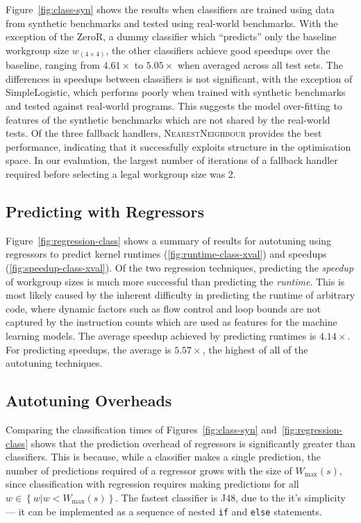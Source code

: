\documentclass[preprint,nonatbib,10pt,nocopyrightspace]{sigplanconf}
\begin{document}
Figure~\ref{fig:class-syn} shows the results when classifiers are
trained using data from synthetic benchmarks and tested using
real-world benchmarks. With the exception of the ZeroR, a dummy
classifier which ``predicts'' only the baseline workgroup size
$w_{\left( 4 \times 4 \right)}$, the other classifiers achieve good
speedups over the baseline, ranging from $4.61\times$ to $5.05\times$
when averaged across all test sets. The differences in speedups
between classifiers is not significant, with the exception of
SimpleLogistic, which performs poorly when trained with synthetic
benchmarks and tested against real-world programs. This suggests the
model over-fitting to features of the synthetic benchmarks which are
not shared by the real-world tests. Of the three fallback handlers,
\textsc{NearestNeighbour} provides the best performance, indicating
that it successfully exploits structure in the optimisation space. In
our evaluation, the largest number of iterations of a fallback handler
required before selecting a legal workgroup size was 2.


\subsection{Predicting with Regressors}

Figure~\ref{fig:regression-class} shows a summary of results for
autotuning using regressors to predict kernel runtimes
(\ref{fig:runtime-class-xval}) and speedups
(\ref{fig:speedup-class-xval}). Of the two regression techniques,
predicting the \emph{speedup} of workgroup sizes is much more
successful than predicting the \emph{runtime}. This is most likely
caused by the inherent difficulty in predicting the runtime of
arbitrary code, where dynamic factors such as flow control and loop
bounds are not captured by the instruction counts which are used as
features for the machine learning models. The average speedup achieved
by predicting runtimes is $4.14\times$. For predicting speedups, the
average is $5.57\times$, the highest of all of the autotuning
techniques.

\subsection{Autotuning Overheads}

Comparing the classification times of Figures~\ref{fig:class-syn}
and~\ref{fig:regression-class} shows that the prediction overhead of
regressors is significantly greater than classifiers. This is because,
while a classifier makes a single prediction, the number of
predictions required of a regressor grows with the size of
$W_{\max}(s)$, since classification with regression requires making
predictions for all $w \in \left\{ w | w < W_{\max}(s) \right\}$. The
fastest classifier is J48, due to the it's simplicity --- it can be
implemented as a sequence of nested \texttt{if} and \texttt{else}
statements.
\end{document}
